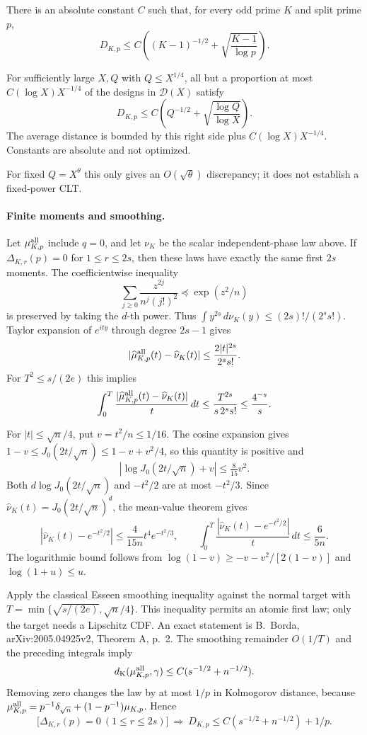 \begin{theorem}
There is an absolute constant $C$ such that, for every odd prime $K$ and
split prime $p$,
\[
 D_{K,p}\le C\left((K-1)^{-1/2}
                    +\sqrt{\frac{K-1}{\log p}}\right).
\]
\end{theorem}

\begin{theorem}
For sufficiently large $X,Q$ with $Q\le X^{1/4}$, all but a proportion
at most $C(\log X)X^{-1/4}$ of the designs in $\mathcal D(X)$ satisfy
\[
 D_{K,p}\le C\left(Q^{-1/2}
                   +\sqrt{\frac{\log Q}{\log X}}\right).
\]
The average distance is bounded by this right side plus
$C(\log X)X^{-1/4}$. Constants are absolute and not optimized.
\end{theorem}
For fixed $Q=X^\theta$ this only gives an $O(\sqrt\theta)$ discrepancy;
it does not establish a fixed-power CLT.

\paragraph{Finite moments and smoothing.}
Let $\mu^{\rm all}_{K,p}$ include $q=0$, and let $\nu_K$ be the scalar
independent-phase law above. If $\Delta_{K,r}(p)=0$ for $1\le r\le2s$,
then these laws have exactly the same first $2s$ moments.
The coefficientwise inequality
\[
 \sum_{j\ge0}\frac{z^{2j}}{n^j(j!)^2}\preceq\exp(z^2/n)
\]
is preserved by taking the $d$-th power. Thus
$\int y^{2s}\,d\nu_K(y)\le(2s)!/(2^ss!)$.
Taylor expansion of $e^{ity}$ through degree $2s-1$ gives
\[
 |\widehat\mu^{\rm all}_{K,p}(t)-\widehat\nu_K(t)|
 \le\frac{2|t|^{2s}}{2^ss!}.
\]
For $T^2\le s/(2e)$ this implies
\[
 \int_0^T\frac{|\widehat\mu^{\rm all}_{K,p}(t)-\widehat\nu_K(t)|}{t}\,dt
 \le\frac{T^{2s}}{s\,2^ss!}\le\frac{4^{-s}}s.
\]

For $|t|\le\sqrt n/4$, put $v=t^2/n\le1/16$.
The cosine expansion gives
$1-v\le J_0(2t/\sqrt n)\le1-v+v^2/4$, so this quantity is positive and
\[
 |\log J_0(2t/\sqrt n)+v|\le\tfrac8{15}v^2.
\]
Both $d\log J_0(2t/\sqrt n)$ and $-t^2/2$ are at most $-t^2/3$.
Since $\widehat\nu_K(t)=J_0(2t/\sqrt n)^d$, the mean-value theorem gives
\[
 |\widehat\nu_K(t)-e^{-t^2/2}|
 \le\frac4{15n}t^4e^{-t^2/3},\qquad
 \int_0^T\frac{|\widehat\nu_K(t)-e^{-t^2/2}|}{t}\,dt\le\frac6{5n}.
\]
The logarithmic bound follows from
$\log(1-v)\ge-v-v^2/[2(1-v)]$ and $\log(1+u)\le u$.

Apply the classical Esseen smoothing inequality against the normal target
with $T=\min\{\sqrt{s/(2e)},\sqrt n/4\}$. This inequality permits an atomic
first law; only the target needs a Lipschitz CDF. An exact statement is
B.~Borda, arXiv:2005.04925v2, Theorem A, p.~2.
The smoothing remainder $O(1/T)$ and the preceding integrals imply
\[
 d_{\rm K}(\mu^{\rm all}_{K,p},\gamma)\le C(s^{-1/2}+n^{-1/2}).
\]
Removing zero changes the law by at most $1/p$ in Kolmogorov distance, because
$\mu^{\rm all}_{K,p}=p^{-1}\delta_{\sqrt n}+(1-p^{-1})\mu_{K,p}$. Hence
\begin{equation}
 \big[\Delta_{K,r}(p)=0\ (1\le r\le2s)\big]
 \ \Longrightarrow\
 D_{K,p}\le C(s^{-1/2}+n^{-1/2})+1/p.
 \label{eq:cayley-finite-moment-rate}
\end{equation}

